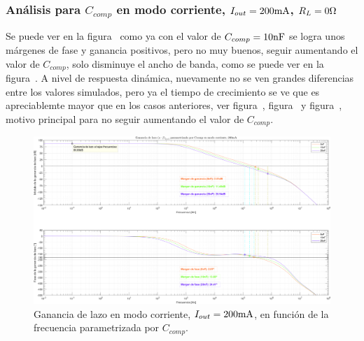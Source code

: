 \clearpage


\subsubsection{Análisis para $C_{comp}$ en modo corriente, $I_{out} = 200 \si[per-mode=symbol]{\milli\ampere}$, $R_{L} = 0 \si[per-mode=symbol]{\ohm}$}

Se puede ver en la figura~ como ya con el valor de $C_{comp} = 10 \si[per-mode=symbol]{\nano\farad}$ se logra unos márgenes de fase y ganancia positivos, pero no muy buenos, seguir aumentando el valor de $C_{comp}$, solo disminuye el ancho de banda, como se puede ver en la figura~. A nivel de respuesta dinámica, nuevamente no se ven grandes diferencias entre los valores simulados, pero ya el tiempo de crecimiento se ve que es apreciablemte mayor que en los casos anteriores, ver figura~, figura~ y figura~, motivo principal para no seguir aumentando el valor de $C_{comp}$.

\vfill



\clearpage

\begin{figure}[H] %
\begin{center}
\includegraphics[width=1.1 \textwidth, angle=90]{./img/plots/loop/power_supply_CCOMP_LOOP_Modo4.png}
\caption{\label{fig:fig_power_supply_CCOMP_LOOP_Modo4}\footnotesize{Ganancia de lazo en modo corriente, $I_{out} = 200 \si[per-mode=symbol]{\milli\ampere}$, en función de la frecuencia parametrizada por $C_{comp}$.}}
\end{center}
\end{figure}


